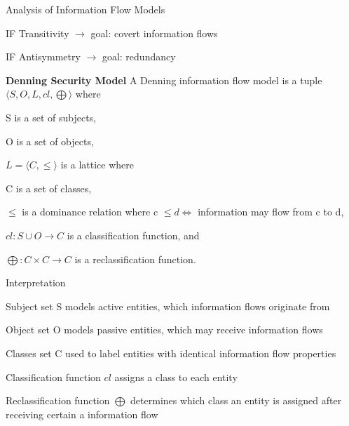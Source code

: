 \documentclass[a4paper]{article}
\renewcommand{\note}[2]{\begin{noteBox} \textbf{#1} #2 \end{noteBox}}
\begin{document}
\begin{multicols}{3}
    Analysis of Information Flow Models
    \begin{itemize*}
        \item IF Transitivity $\rightarrow$ goal: covert information flows
        \item IF Antisymmetry $\rightarrow$ goal: redundancy
    \end{itemize*}

    \note{Denning Security Model}{A Denning information flow model is a tuple $\langle S,O,L,cl,\bigoplus\rangle$ where
        \begin{itemize*}
            \item S is a set of subjects,
            \item O is a set of objects,
            \item $L=\langle C,\leq\rangle$ is a lattice where
            \begin{itemize*}
                \item C is a set of classes,
                \item $\leq$ is a dominance relation where c $\leq d \Leftrightarrow$ information may flow from c to d,
            \end{itemize*}
            \item $cl:S\cup O\rightarrow C$ is a classification function, and
            \item $\bigoplus:C\times C\rightarrow C$ is a reclassification function.
        \end{itemize*}
    }

    Interpretation
    \begin{itemize*}
        \item Subject set S models active entities, which information flows originate from
        \item Object set O models passive entities, which may receive information flows
        \item Classes set C used to label entities with identical information flow properties
        \item Classification function $cl$ assigns a class to each entity
        \item Reclassification function $\bigoplus$ determines which class an entity is assigned after receiving certain a information flow
    \end{itemize*}


\end{multicols}
\end{document}
